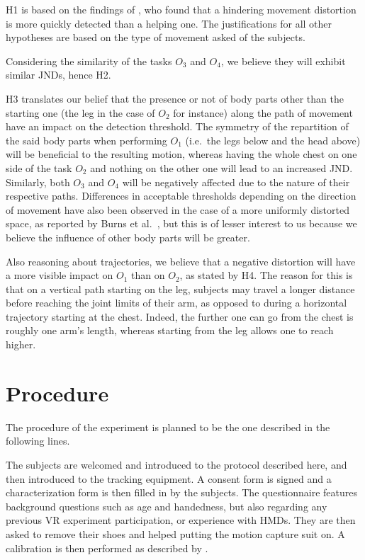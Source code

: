 H1 is based on the findings of \cite{debarba2017embodiment}, who found that a hindering movement distortion is more quickly detected than a helping one. The justifications for all other hypotheses are based on the type of movement asked of the subjects.

Considering the similarity of the tasks $O_3$ and $O_4$, we believe they will exhibit similar JNDs, hence H2.

H3 translates our belief that the presence or not of body parts other than the starting one (the leg in the case of $O_2$ for instance) along the path of movement have an impact on the detection threshold. The symmetry of the repartition of the said body parts when performing $O_1$ (i.e.\ the legs below and the head above) will be beneficial to the resulting motion, whereas having the whole chest on one side of the task $O_2$ and nothing on the other one will lead to an increased JND. Similarly, both $O_3$ and $O_4$ will be negatively affected due to the nature of their respective paths. Differences in acceptable thresholds depending on the direction of movement have also been observed in the case of a more uniformly distorted space, as reported by Burns et al.\ \cite{burns2007macbeth}, but this is of lesser interest to us because we believe the influence of other body parts will be greater.

Also reasoning about trajectories, we believe that a negative distortion will have a more visible impact on $O_1$ than on $O_2$, as stated by H4. The reason for this is that on a vertical path starting on the leg, subjects may travel a longer distance before reaching the joint limits of their arm, as opposed to during a horizontal trajectory starting at the chest. Indeed, the further one can go from the chest is roughly one arm's length, whereas starting from the leg allows one to reach higher.

\section{Procedure}

The procedure of the experiment is planned to be the one described in the following lines.

The subjects are welcomed and introduced to the protocol described here, and then introduced to the tracking equipment. A consent form is signed and a characterization form is then filled in by the subjects. The questionnaire features background questions such as age and handedness, but also regarding any previous VR experiment participation, or experience with HMDs. They are then asked to remove their shoes and helped putting the motion capture suit on. A calibration is then performed as described by \cite{molla2017egocentric}.

